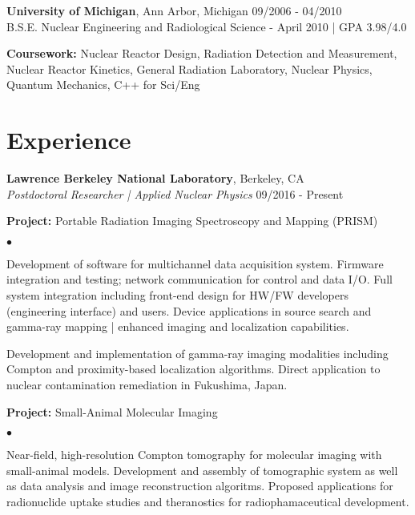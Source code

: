 \documentclass[margin,line]{res}
\newenvironment{list1}{
  \begin{list}{\ding{113}}{%
      \setlength{\itemsep}{0in}
      \setlength{\parsep}{0in} \setlength{\parskip}{0in}
      \setlength{\topsep}{0in} \setlength{\partopsep}{0in} 
      \setlength{\leftmargin}{0.17in}}}{\end{list}}
\newenvironment{list2}{
  \begin{list}{$\bullet$}{%
      \setlength{\itemsep}{0in}
      \setlength{\parsep}{0in} \setlength{\parskip}{0in}
      \setlength{\topsep}{0in} \setlength{\partopsep}{0in} 
      \setlength{\leftmargin}{0.2in}}}{\end{list}}
\begin{document}
\begin{resume}
{\bf University of Michigan}, Ann Arbor, Michigan \hfill 09/2006 - 04/2010\\
B.S.E. Nuclear Engineering and Radiological Science - April 2010 | GPA 3.98/4.0
\begin{list1}
\item[] {\bf \small Coursework:} Nuclear Reactor Design, Radiation Detection 
                                 and Measurement, Nuclear Reactor Kinetics,
                                 General Radiation Laboratory, Nuclear Physics,
                                 Quantum Mechanics, C++ for Sci/Eng
\end{list1}

\section{\sc Experience}
{\bf Lawrence Berkeley National Laboratory}, Berkeley, CA \\
{\em Postdoctoral Researcher | Applied Nuclear Physics} \hfill 09/2016 - Present

\begin{list1}
  \item[] {\bf \small Project:} Portable Radiation Imaging Spectroscopy and Mapping (PRISM)
  \begin{list2}
    \item Development of software for multichannel data acquisition system.
          Firmware integration and testing; network communication for control
          and data I/O.
          Full system integration including front-end design for HW/FW
          developers (engineering interface) and users.
          Device applications in source search and gamma-ray mapping | 
          enhanced imaging and localization capabilities.
    \item Development and implementation of gamma-ray imaging modalities
          including Compton and proximity-based localization algorithms.
          Direct application to nuclear contamination remediation in 
          Fukushima, Japan.
  \end{list2}
  \item[] {\bf \small Project:} Small-Animal Molecular Imaging
  \begin{list2}
    \item Near-field, high-resolution Compton tomography for molecular imaging
          with small-animal models.
          Development and assembly of tomographic system as well as data 
          analysis and image reconstruction algoritms.
          Proposed applications for radionuclide uptake studies and theranostics
          for radiophamaceutical development.
  \end{list2}
\end{list1}


\end{resume}
\end{document}
